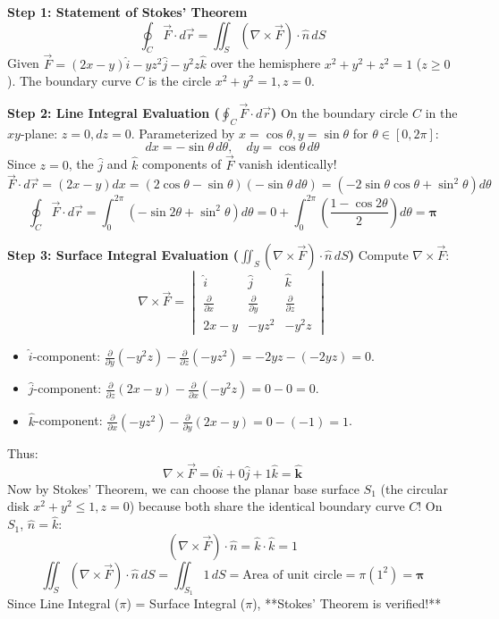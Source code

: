 \begin{solutionbox}
\textbf{Step 1: Statement of Stokes' Theorem}
\[
\oint_C \vec{F} \cdot d\vec{r} = \iint_S (\nabla \times \vec{F}) \cdot \hat{n} \, dS
\]
Given $\vec{F} = (2x - y)\hat{i} - y z^2\hat{j} - y^2 z\hat{k}$ over the hemisphere $x^2 + y^2 + z^2 = 1$ ($z \ge 0$).
The boundary curve $C$ is the circle $x^2 + y^2 = 1, z = 0$.

\textbf{Step 2: Line Integral Evaluation ($\oint_C \vec{F} \cdot d\vec{r}$)}
On the boundary circle $C$ in the $xy$-plane: $z = 0, dz = 0$.
Parameterized by $x = \cos\theta, y = \sin\theta$ for $\theta \in [0, 2\pi]$:
\[
dx = -\sin\theta \, d\theta, \quad dy = \cos\theta \, d\theta
\]
Since $z = 0$, the $\hat{j}$ and $\hat{k}$ components of $\vec{F}$ vanish identically!
\[
\vec{F} \cdot d\vec{r} = (2x - y) dx = (2\cos\theta - \sin\theta)(-\sin\theta \, d\theta) = (-2\sin\theta\cos\theta + \sin^2\theta) d\theta
\]
\[
\oint_C \vec{F} \cdot d\vec{r} = \int_0^{2\pi} (-\sin 2\theta + \sin^2\theta) d\theta = 0 + \int_0^{2\pi} \left(\frac{1 - \cos 2\theta}{2}\right) d\theta = \mathbf{\pi}
\]

\textbf{Step 3: Surface Integral Evaluation ($\iint_S (\nabla \times \vec{F}) \cdot \hat{n} \, dS$)}
Compute $\nabla \times \vec{F}$:
\[
\nabla \times \vec{F} = \begin{vmatrix} \hat{i} & \hat{j} & \hat{k} \\ \frac{\partial}{\partial x} & \frac{\partial}{\partial y} & \frac{\partial}{\partial z} \\ 2x - y & -yz^2 & -y^2 z \end{vmatrix}
\]
\begin{itemize}[leftmargin=6mm]
    \item $\hat{i}$-component: $\frac{\partial}{\partial y}(-y^2 z) - \frac{\partial}{\partial z}(-yz^2) = -2yz - (-2yz) = 0$.
    \item $\hat{j}$-component: $\frac{\partial}{\partial z}(2x - y) - \frac{\partial}{\partial x}(-y^2 z) = 0 - 0 = 0$.
    \item $\hat{k}$-component: $\frac{\partial}{\partial x}(-yz^2) - \frac{\partial}{\partial y}(2x - y) = 0 - (-1) = 1$.
\end{itemize}
Thus:
\[
\nabla \times \vec{F} = 0\hat{i} + 0\hat{j} + 1\hat{k} = \mathbf{\hat{k}}
\]
Now by Stokes' Theorem, we can choose the planar base surface $S_1$ (the circular disk $x^2 + y^2 \le 1, z=0$) because both share the identical boundary curve $C$!
On $S_1$, $\hat{n} = \hat{k}$:
\[
(\nabla \times \vec{F}) \cdot \hat{n} = \hat{k} \cdot \hat{k} = 1
\]
\[
\iint_S (\nabla \times \vec{F}) \cdot \hat{n} \, dS = \iint_{S_1} 1 \, dS = \text{Area of unit circle} = \pi (1^2) = \mathbf{\pi}
\]
Since Line Integral ($\pi$) = Surface Integral ($\pi$), **Stokes' Theorem is verified!**


\end{solutionbox}
